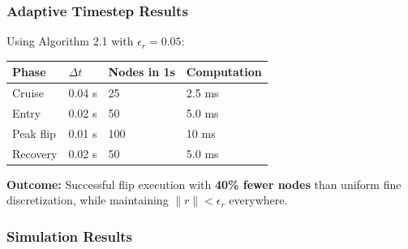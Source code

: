 \documentclass[
  letterpaper,
  DIV=11,
  numbers=noendperiod]{scrartcl}
\begin{document}
\subsubsection{Adaptive Timestep
Results}\label{adaptive-timestep-results}

Using Algorithm 2.1 with \(\epsilon_r = 0.05\):

\begin{longtable}[]{@{}llll@{}}
\toprule\noalign{}
Phase & \(\Delta t\) & Nodes in 1s & Computation \\
\midrule\noalign{}
\endhead
\bottomrule\noalign{}
\endlastfoot
Cruise & 0.04 s & 25 & 2.5 ms \\
Entry & 0.02 s & 50 & 5.0 ms \\
Peak flip & 0.01 s & 100 & 10 ms \\
Recovery & 0.02 s & 50 & 5.0 ms \\
\end{longtable}

\textbf{Outcome:} Successful flip execution with \textbf{40\% fewer
nodes} than uniform fine discretization, while maintaining
\(\|r\| < \epsilon_r\) everywhere.

\subsubsection{Simulation Results}\label{simulation-results}
\end{document}
